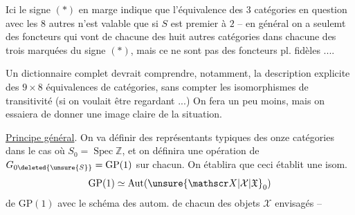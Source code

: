 Ici le signe $(*)$ en marge indique que l'équivalence des 3 catégories en question avec les 8 autres n'est valable que si $S$ est premier à $2$ -- en général on a seulemt des foncteurs qui vont de chacune des huit autres catégories dans chacune des trois marquées du signe $(*)$, mais ce ne sont pas des foncteurs pl. fidèles ....

Un dictionnaire complet devrait comprendre, notamment, la description explicite des $9\times8$ équivalences de catégories, sans compter les  isomorphismes de transitivité (si on voulait être regardant ...) On fera un peu moins, mais on essaiera de donner une image claire de la situation.

\uline{Principe général}. On va définir des représentants typiques des onze catégories dans le cas où $S_0=\operatorname{Spec}\mathbb Z$, et on définira une opération de $G_{0\deleted{\unsure{S}}}=\mathrm{GP}(1)$ sur chacun. On établira que ceci établit une isom.
\[
 \mathrm{GP}(1)\simeq\operatorname{Aut}(\unsure{\mathscr X|\mathcal X|\mathfrak X}_0)
\]
de $\mathrm{GP}(1)$ avec le schéma des autom. de chacun des objets $\mathscr X$ envisagés -- 
